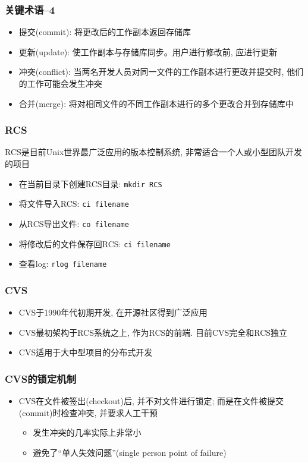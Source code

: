 \documentclass[compress]{beamer}
\begin{document}
\begin{frame}
\frametitle{关键术语--4}
\begin{itemize}
\item 提交(commit): 将更改后的工作副本返回存储库
\item 更新(update): 使工作副本与存储库同步。用户进行修改前, 应进行更新
\item 冲突(conflict): 当两名开发人员对同一文件的工作副本进行更改并提交时, 
  他们的工作可能会发生冲突
\item 合并(merge): 将对相同文件的不同工作副本进行的多个更改合并到存储库中

\end{itemize}

\end{frame}

\begin{frame}[containsverbatim]
\frametitle{RCS}
RCS是目前Unix世界最广泛应用的版本控制系统, 非常适合一个人或小型团队开发的项目

\begin{itemize}
\item 在当前目录下创建RCS目录: \verb~mkdir RCS~
\item 将文件导入RCS: \verb~ci filename~
\item 从RCS导出文件: \verb~co filename~
\item 将修改后的文件保存回RCS: \verb~ci filename~
\item 查看log: \verb~rlog filename~
\end{itemize}


\end{frame}


\begin{frame}
\frametitle{CVS}
\begin{itemize}
\item CVS于1990年代初期开发, 在开源社区得到广泛应用
\item CVS最初架构于RCS系统之上, 作为RCS的前端. 目前CVS完全和RCS独立
\item CVS适用于大中型项目的分布式开发
  \end{itemize}

  
\end{frame}

\begin{frame}
\frametitle{CVS的锁定机制}
\begin{itemize}
\item CVS在文件被签出(checkout)后, 并不对文件进行锁定; 而是在文件被提交(commit)时检查冲突, 并要求人工干预
    \begin{itemize}
    \item 发生冲突的几率实际上非常小
    \item 避免了``单人失效问题''(single person point of failure)
    \end{itemize}
\end{itemize}


\end{frame}
\end{document}

